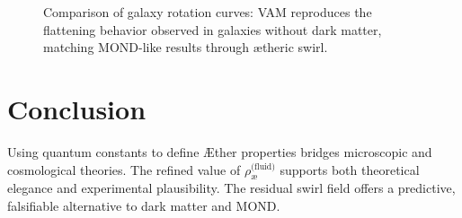 \documentclass[12pt]{article}
\begin{document}
    \begin{figure}[h]
        \centering
        \caption{Comparison of galaxy rotation curves: VAM reproduces the flattening behavior observed in galaxies without dark matter, matching MOND-like results through ætheric swirl.}
    \end{figure}


    \section{Conclusion}

    Using quantum constants to define \AE{}ther properties bridges microscopic and cosmological theories. The refined value of $\rho_{\text{\ae}}^{\text{(fluid)}}$ supports both theoretical elegance and experimental plausibility. The residual swirl field offers a predictive, falsifiable alternative to dark matter and MOND.

    
    
\end{document}
